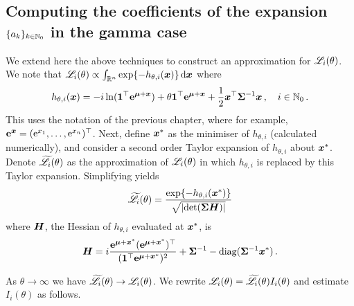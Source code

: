 \begin{subappendices}
\section{Computing the coefficients of the expansion $\{a_{k}\}_{k\in\mathbb{N}_0}$
in the gamma case} \label{app:proof}



We extend here the above techniques to construct an approximation
for $\mathscr{L}_i(\theta)$. We note that $\mathscr{L}_i(\theta) \propto \int_{\mathbb{R}^n} \exp\{ -h_{\theta,i}(\bm{x}) \} \mathop{}\!\mathrm{d} \bm{x} $ where
\[ h_{\theta,i}(\bm{x}) = - i \ln(\bm{1}^\top \text{\bf{e}}^{\bm{\mu} + \bm{x}}) + \theta \bm{1}^\top \text{\bf{e}}^{\bm{\mu} + \bm{x}} + \frac12 \bm{x}^\top \bm{\Sigma}^{-1} \bm{x} \,, \quad i \in \mathbb{N}_0 \,. \]
This uses the notation of the previous chapter, where for example, $\text{\bf{e}}^{\bm{x}} = (\mathrm{e}^{x_1}, \dots, \mathrm{e}^{x_n})^\top$. Next, define $\bm{x}^*$ as the minimiser of $h_{\theta,i}$ (calculated numerically), and consider a second order Taylor expansion of $h_{\theta,i}$ about $\bm{x}^*$. Denote $\widetilde{\mathscr{L}}_i(\theta)$ as the approximation of $\mathscr{L}_i(\theta)$ in which $h_{\theta,i}$ is replaced by this Taylor expansion. Simplifying yields
\begin{equation} \label{firstTerm}
	\widetilde{\mathscr{L}}_i(\theta) = \frac{ \exp\{-h_{\theta,i}(\bm{x}^*)\} }{ \sqrt{ \lvert \det(\bm{\Sigma} \bm{H})\rvert }}
\end{equation}
where $\bm{H}$, the Hessian of $h_{\theta,i}$ evaluated at $\bm{x}^*$, is
\[ \bm{H} = i\frac{\text{\bf{e}}^{\bm{\mu} + \bm{x}^*} (\text{\bf{e}}^{\bm{\mu} + \bm{x}^*})^\top}{(\bm{1}^\top \text{\bf{e}}^{\bm{\mu} + \bm{x}^*})^2} + \bm{\Sigma}^{-1} - \mathrm{diag}(\bm{\Sigma}^{-1} \bm{x}^*) \,. \]

As $\theta \to \infty$ we have $\widetilde{\mathscr{L}}_i(\theta) \to \mathscr{L}_i(\theta)$. We rewrite $\mathscr{L}_i(\theta) = \widetilde{\mathscr{L}}_i(\theta) I_i(\theta)$ and estimate $I_i(\theta)$ as follows.


\end{subappendices}
